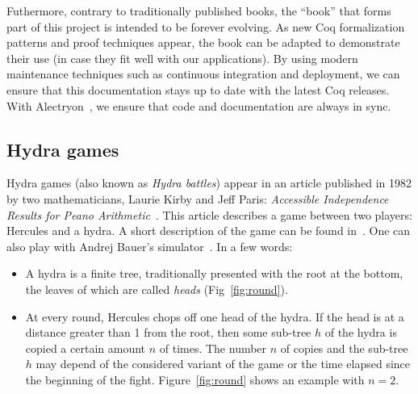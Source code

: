 \documentclass{easychair}
\begin{document}
Futhermore, contrary to traditionally published books, the ``book'' that forms part of this project is intended to be forever evolving. As new Coq formalization patterns and proof techniques appear, the book can be adapted to demonstrate their use (in case they fit well with our applications).
%
By using modern maintenance techniques such as continuous integration and deployment, we can ensure that this documentation stays up to date with the latest Coq releases. With Alectryon~\cite{alectryonpaper, alectryongithub}, we ensure that code and documentation are always in sync.

\subsection{Hydra games}
Hydra games (also known as \emph{Hydra battles}) appear in an article published in 1982 by two mathematicians, 
Laurie Kirby and Jeff Paris: \emph{Accessible Independence Results for Peano Arithmetic}~\cite{KP82}.
This article describes a game between two players: Hercules and a hydra.
A short description of the game  can be found in~\cite{bauer2008, KP82, JFLA2018paper}. One can also play with
Andrej Bauer's simulator~\cite{BauerHydra}.
In a few words:
\begin{itemize}
\item A hydra is a finite tree, traditionally presented with the root at the bottom, the leaves of which are called \emph{heads}
  (Fig~\ref{fig:round}).
\item At every round, Hercules chops off one head of the hydra. If the head is at a distance greater than 1 from the root,
  then some sub-tree $h$ of the hydra is copied a certain amount $n$ of times. The number $n$ of copies and the sub-tree $h$ may depend of the considered variant of the game
  or the time elapsed since the beginning of the fight.
  Figure~\ref{fig:round} shows an example with $n=2$.
\end{itemize}
\end{document}
